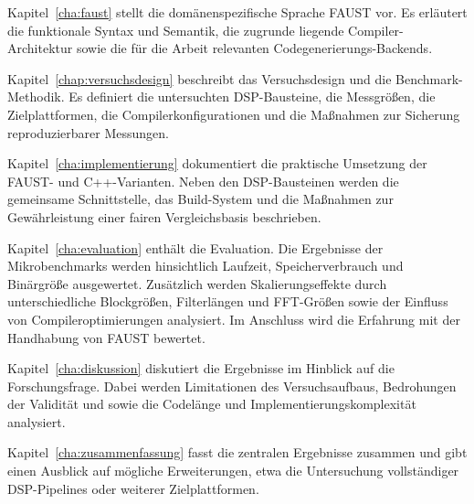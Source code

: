 Kapitel~\ref{cha:faust} stellt die domänenspezifische Sprache FAUST vor. Es erläutert die funktionale Syntax und Semantik, die zugrunde liegende Compiler-Architektur sowie die für die Arbeit relevanten Codegenerierungs-Backends.


Kapitel~\ref{chap:versuchsdesign} beschreibt das Versuchsdesign und die Benchmark-Methodik. Es definiert die untersuchten DSP-Bausteine, die Messgrößen, die Zielplattformen, die Compilerkonfigurationen und die Maßnahmen zur Sicherung reproduzierbarer Messungen.


Kapitel~\ref{cha:implementierung} dokumentiert die praktische Umsetzung der FAUST- und C++-Varianten. Neben den DSP-Bausteinen werden die gemeinsame Schnittstelle, das Build-System und die Maßnahmen zur Gewährleistung einer fairen Vergleichsbasis beschrieben.


Kapitel~\ref{cha:evaluation} enthält die Evaluation. Die Ergebnisse der Mikrobenchmarks werden hinsichtlich Laufzeit, Speicherverbrauch und Binärgröße ausgewertet. Zusätzlich werden Skalierungseffekte durch unterschiedliche Blockgrößen, Filterlängen und FFT-Größen sowie der Einfluss von Compileroptimierungen analysiert. Im Anschluss wird die Erfahrung mit der Handhabung von FAUST bewertet.


Kapitel~\ref{cha:diskussion} diskutiert die Ergebnisse im Hinblick auf die Forschungsfrage. Dabei werden Limitationen des Versuchsaufbaus, Bedrohungen der Validität und sowie die Codelänge und
Implementierungskomplexität analysiert.

Kapitel~\ref{cha:zusammenfassung} fasst die zentralen Ergebnisse zusammen und gibt einen Ausblick auf mögliche Erweiterungen, etwa die Untersuchung vollständiger DSP-Pipelines oder weiterer Zielplattformen.

